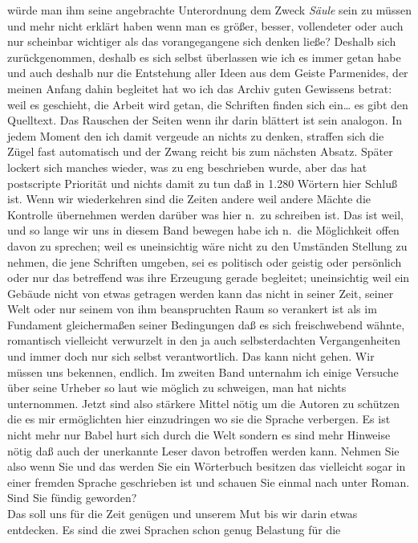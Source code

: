 \documentclass[
]{article}
\begin{document}
würde man ihm seine angebrachte Unterordnung dem Zweck \emph{Säule} sein
zu müssen und mehr nicht erklärt haben wenn man es größer, besser,
vollendeter oder auch nur scheinbar wichtiger als das vorangegangene
sich denken ließe? Deshalb sich zurückgenommen, deshalb es sich selbst
überlassen wie ich es immer getan habe und auch deshalb nur die
Entstehung aller Ideen aus dem Geiste Parmenides\textquotesingle, der
meinen Anfang dahin begleitet hat wo ich das Archiv guten Gewissens
betrat: weil es geschieht, die Arbeit wird getan, die Schriften finden
sich ein\ldots{} es gibt den Quelltext. Das Rauschen der Seiten wenn ihr
darin blättert ist sein analogon. In jedem Moment den ich damit vergeude
an nichts zu denken, straffen sich die Zügel fast automatisch und der
Zwang reicht bis zum nächsten Absatz. Später lockert sich manches
wieder, was zu eng beschrieben wurde, aber das hat postscripte Priorität
und nichts damit zu tun daß in 1.280 Wörtern hier Schluß ist. Wenn wir
wiederkehren sind die Zeiten andere weil andere Mächte die Kontrolle
übernehmen werden darüber was hier n.~zu schreiben ist. Das ist weil,
und so lange wir uns in diesem Band bewegen habe ich n.~die Möglichkeit
offen davon zu sprechen; weil es uneinsichtig wäre nicht zu den
Umständen Stellung zu nehmen, die jene Schriften umgeben, sei es
politisch oder geistig oder persönlich oder nur das betreffend was ihre
Erzeugung gerade begleitet; uneinsichtig weil ein Gebäude nicht von
etwas getragen werden kann das nicht in seiner Zeit, seiner Welt oder
nur seinem von ihm beanspruchten Raum so verankert ist als im Fundament
gleichermaßen seiner Bedingungen daß es sich freischwebend wähnte,
romantisch vielleicht verwurzelt in den ja auch selbsterdachten
Vergangenheiten und immer doch nur sich selbst verantwortlich. Das kann
nicht gehen. Wir müssen uns bekennen, endlich. Im zweiten Band unternahm
ich einige Versuche über seine Urheber so laut wie möglich zu schweigen,
man hat nichts unternommen. Jetzt sind also stärkere Mittel nötig um die
Autoren zu schützen die es mir ermöglichten hier einzudringen wo sie die
Sprache verbergen. Es ist nicht mehr nur Babel hurt sich durch die Welt
sondern es sind mehr Hinweise nötig daß auch der unerkannte Leser davon
betroffen werden kann. Nehmen Sie also wenn Sie und das werden Sie ein
Wörterbuch besitzen das vielleicht sogar in einer fremden Sprache
geschrieben ist und schauen Sie einmal nach unter Roman. Sind Sie fündig
geworden?\\
Das soll uns für die Zeit genügen und unserem Mut bis wir darin etwas
entdecken. Es sind die zwei Sprachen schon genug Belastung für die
\end{document}
